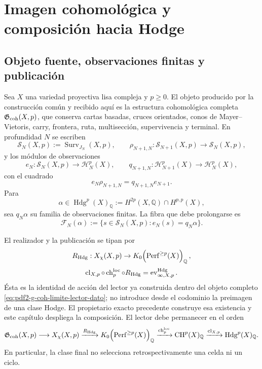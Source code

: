 \chapter{Imagen cohomológica y composición hacia Hodge}

\section{Objeto fuente, observaciones finitas y publicación}

Sea $X$ una variedad proyectiva lisa compleja y $p\ge0$. El objeto producido por
la construcción común y recibido aquí es la estructura cohomológica completa
$\mathfrak G_{\rm coh}(X,p)$, que conserva
cartas basadas, cruces orientados, conos de Mayer--Vietoris, carry,
frontera, ruta, multisección, supervivencia y terminal. En profundidad $N$ se
escriben
\begin{equation}\label{eq:pdf2-hodge-sistemas}
 \mathscr S_N(X,p):=\operatorname{Surv}_{J_N}(X,p),
 \qquad
 \rho_{N+1,N}:\mathscr S_{N+1}(X,p)\to\mathscr S_N(X,p),
\end{equation}
y los módulos de observaciones
\begin{equation}\label{eq:pdf2-hodge-observaciones}
 e_N:\mathscr S_N(X,p)\to\mathscr H_N^p(X),
 \qquad
 q_{N+1,N}:\mathscr H_{N+1}^p(X)\to\mathscr H_N^p(X),
\end{equation}
con el cuadrado
\begin{equation}\label{eq:pdf2-hodge-cuadrado-restriccion}
 e_N\rho_{N+1,N}=q_{N+1,N}e_{N+1}.
\end{equation}
Para
\[
 \alpha\in\operatorname{Hdg}^p(X)_{\mathbb Q}
 :=H^{2p}(X,\mathbb Q)\cap H^{p,p}(X),
\]
sea $q_N\alpha$ su familia de observaciones finitas. La fibra que debe
prolongarse es
\begin{equation}\label{eq:pdf2-hodge-fibra-alpha}
 \mathscr F_N(\alpha):=
 \{s\in\mathscr S_N(X,p):e_N(s)=q_N\alpha\}.
\end{equation}

El realizador y la publicación se tipan por
\begin{equation}\label{eq:pdf2-hodge-realizador}
 R_{\rm Hdg}:X_\chi(X,p)\to
 K_0\!\left(\operatorname{Perf}^{\ge p}(X)\right)_{\mathbb Q},
\end{equation}
\begin{equation}\label{eq:pdf2-hodge-publicacion}
 \operatorname{cl}_{X,p}\circ\operatorname{ch}^{\rm loc}_p
 \circ R_{\rm Hdg}
 =\operatorname{ev}^{\rm Hdg}_{\infty,X,p}.
\end{equation}
Ésta es la identidad de acción del lector ya construida dentro del objeto completo
\eqref{eq:pdf2-g-coh-limite-lector-dato}; no introduce desde el codominio la
preimagen de una clase Hodge. El propietario exacto precedente construye esa
existencia y este capítulo despliega la composición. El lector
debe permanecer en el orden
\[
 \mathfrak G_{\rm coh}(X,p)
 \longrightarrow X_\chi(X,p)
 \xrightarrow{R_{\rm Hdg}}
 K_0\!\left(\operatorname{Perf}^{\ge p}(X)\right)_{\mathbb Q}
 \xrightarrow{\operatorname{ch}^{\rm loc}_p}
 \operatorname{CH}^p(X)_{\mathbb Q}
 \xrightarrow{\operatorname{cl}_{X,p}}
 \operatorname{Hdg}^p(X)_{\mathbb Q}.
\]
En particular, la clase final no selecciona retrospectivamente una celda ni
un ciclo.

